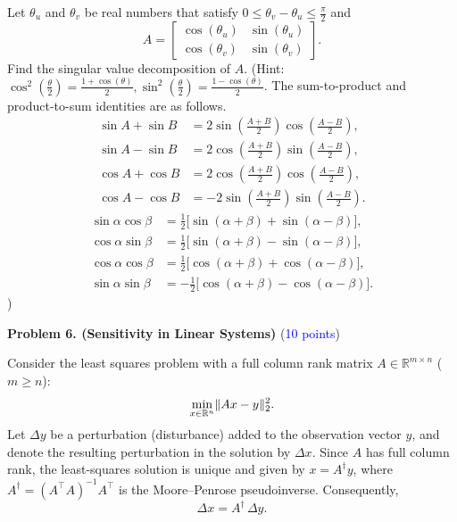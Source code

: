 \documentclass[english,onecolumn]{IEEEtran}
\DeclarePairedDelimiter{\norm}{\lVert}{\rVert}
\newcommand{\0}{{\mathbf{0}}} %
\begin{document}
Let $\theta_u$ and $\theta_v$ be real numbers that satisfy $0\le\theta_v-\theta_u\le \frac{\pi}{2}$ and
\[
A = \begin{bmatrix}
\cos(\theta_u) & \sin(\theta_u) \\
\cos(\theta_v) & \sin(\theta_v)
\end{bmatrix}.
\]
Find the singular value decomposition of $A$. (Hint: $\cos^2\left(\frac{\theta}{2}\right) = \frac{1+\cos(\theta)}{2},\sin^2\left(\frac{\theta}{2}\right) = \frac{1-\cos(\theta)}{2}$. The sum-to-product and product-to-sum identities are as follows.
\[
\begin{aligned}
\sin A + \sin B &= 2\sin\!\left(\tfrac{A+B}{2}\right)\cos\!\left(\tfrac{A-B}{2}\right), \\
\sin A - \sin B &= 2\cos\!\left(\tfrac{A+B}{2}\right)\sin\!\left(\tfrac{A-B}{2}\right), \\
\cos A + \cos B &= 2\cos\!\left(\tfrac{A+B}{2}\right)\cos\!\left(\tfrac{A-B}{2}\right), \\
\cos A - \cos B &= -2\sin\!\left(\tfrac{A+B}{2}\right)\sin\!\left(\tfrac{A-B}{2}\right).
\end{aligned}
\]
\[
\begin{aligned}
\sin\alpha\cos\beta &= \tfrac{1}{2}\big[\sin(\alpha+\beta) + \sin(\alpha-\beta)\big], \\
\cos\alpha\sin\beta &= \tfrac{1}{2}\big[\sin(\alpha+\beta) - \sin(\alpha-\beta)\big], \\
\cos\alpha\cos\beta &= \tfrac{1}{2}\big[\cos(\alpha+\beta) + \cos(\alpha-\beta)\big], \\
\sin\alpha\sin\beta &= -\tfrac{1}{2}\big[\cos(\alpha+\beta) - \cos(\alpha-\beta)\big].
\end{aligned}
\]
)


\bigskip
{}




\newpage
\noindent \textbf{Problem 6. (Sensitivity in Linear Systems)} \hfill (\textcolor{blue}{10 points})

Consider the least squares problem with a full column rank matrix $A\in \mathbb{R}^{m \times n}$ ($m \geq n$):
\[
\min_{x \in \mathbb{R}^n} \norm{Ax - y}_2^2.
\]
Let $\Delta y$ be a perturbation (disturbance) added to the observation vector $y$, and denote the resulting perturbation in the solution by $\Delta x$. Since $A$ has full column rank, the least-squares solution is unique and given by $x = A^\dagger y$, where $A^\dagger = (A^\top A)^{-1} A^\top$ is the Moore–Penrose pseudoinverse. Consequently,
\[
\Delta x = A^\dagger \, \Delta y.
\]
\end{document}
